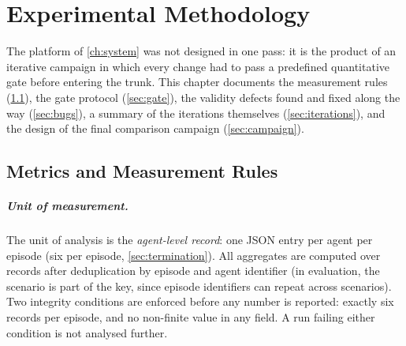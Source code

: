 \chapter{Experimental Methodology}
\label{ch:methodology}

The platform of \cref{ch:system} was not designed in one pass: it is the
product of an iterative campaign in which every change had to pass a
predefined quantitative gate before entering the trunk. This chapter
documents the measurement rules (\cref{sec:metrics}), the gate protocol
(\cref{sec:gate}), the validity defects found and fixed along the way
(\cref{sec:bugs}), a summary of the iterations themselves
(\cref{sec:iterations}), and the design of the final comparison campaign
(\cref{sec:campaign}).

\section{Metrics and Measurement Rules}
\label{sec:metrics}

\paragraph{Unit of measurement.}
The unit of analysis is the \emph{agent-level record}: one JSON entry per
agent per episode (six per episode, \cref{sec:termination}). All
aggregates are computed over records after deduplication by episode and
agent identifier (in evaluation, the scenario is part of the key, since
episode identifiers can repeat across scenarios). Two integrity conditions
are enforced before any number is reported: exactly six records per
episode, and no non-finite value in any field. A run failing either
condition is not analysed further.

